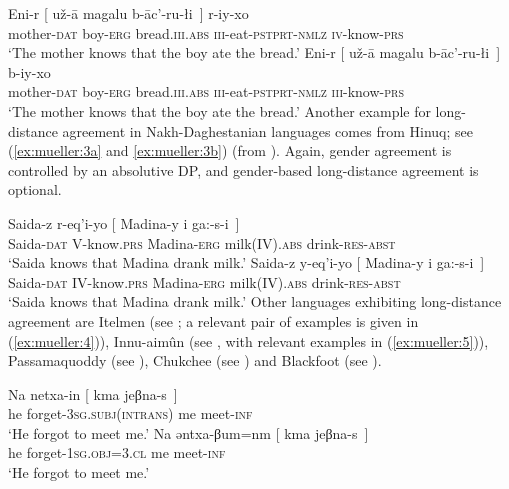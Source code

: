 \documentclass[output=paper
,modfonts
,nonflat]{langsci/langscibook}
\begin{document}
	\ea\label{ex:mueller:2}
	\ea \label{ex:mueller:2a}
	\gll     Eni-r [\sub{$\alpha$} u\v{z}-\={a} magalu b-\={a}c'-ru-\l i~] r-iy-xo \\
	mother-{\scshape dat} {} boy-{\scshape erg} bread.{\scshape iii.abs} {\scshape iii}-eat-{\scshape pstprt-nmlz} {\scshape iv}-know-{\scshape prs} \\
	\glt     `The mother knows that the boy ate the bread.'\newpage
	\ex \label{ex:mueller:2b}
	\gll     Eni-r [\sub{$\alpha$} u\v{z}-\={a} \label{2-b}magalu b-\={a}c'-ru-\l i~] b-iy-xo \\
	mother-{\scshape dat} {} boy-{\scshape erg} bread.{\scshape iii.abs} {\scshape iii}-eat-{\scshape pstprt-nmlz} {\scshape iii}-know-{\scshape prs} \\
	\glt      `The mother knows that the boy ate the bread.'
	\z
	\z
	Another example for long-distance agreement in Nakh-Daghestanian
	languages comes from Hinuq; see (\ref{ex:mueller:3a} and \ref{ex:mueller:3b}) (from
	\citealt{Forker:11}). Again, gender agreement is controlled by an
	absolutive DP, and gender-based long-distance agreement is optional.
	
	\ea\label{ex:mueller:3}
	\ea \label{ex:mueller:3a}
	\gll Sa\textbarglotstop ida-z r-eq'i-yo [\sub{$\alpha$} Madina-y \textgamma i ga:-s-\textbeltl i~] \\
	Saida-{\scshape dat} {V}-know.{\scshape prs} {} Madina-{\scshape erg} milk(IV).{\scshape abs} drink-{\scshape res-abst} \\ 
	\glt `Saida knows that Madina drank milk.'
	\ex \label{ex:mueller:3b}
	\gll  Sa\textbarglotstop ida-z y-eq'i-yo [\sub{$\alpha$} \label{3-b}Madina-y \textgamma i ga:-s-\textbeltl i~] \\
	Saida-{\scshape dat} {IV}-know.{\scshape prs} {} Madina-{\scshape erg} milk({IV}).{\scshape abs} drink-{\scshape res-abst} \\
	\glt  `Saida knows that Madina drank milk.'
	\z
	\z
	Other languages exhibiting long-distance agreement are Itelmen (see
	\citealt{BobaljikWurmbrand:05}; a relevant pair of examples is given in
	(\ref{ex:mueller:4})), Innu-aim\^{u}n (see \citealt{BraniganMacKenzie:02}, with
	relevant examples in (\ref{ex:mueller:5})), Passamaquoddy (see \citealt{Bruening:01}),
	Chukchee (see \citealt{Boskovic:07}) and Blackfoot (see \citealt{Bliss:09}).
	
	\ea\label{ex:mueller:4}
	\ea 
	\gll Na netxa-in [\sub{$\alpha$} kma jeβna-s~] \\
	he forget-{{\scshape 3sg.subj(intrans)}} {} me meet-{\scshape inf} \\
	\glt  `He forgot to meet me.'
	\ex
	\gll Na əntxa-βum=nm [\sub{$\alpha$} kma jeβna-s~] \\
	he forget-{{\scshape 1sg.obj=3.cl}} {} {me} meet-{\scshape inf} \\
	\glt `He forgot to meet me.'
	\z
	\z
	
\end{document}
